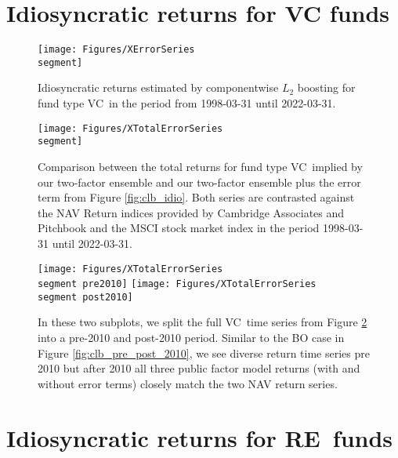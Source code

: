 \clearpage

\appendix

\newcommand{\segment}{BO}

\section{Idiosyncratic returns for VC funds}
\label{sec:vc_errors}


\renewcommand{\segment}{VC}

\begin{figure}[H]
	\centering
	\texttt{[image: Figures/XErrorSeries\\segment]}
	\caption{Idiosyncratic returns estimated by componentwise $L_2$ boosting for fund type \segment \ in the period from 1998-03-31 until 2022-03-31.}
	\label{fig:clb_idio_\segment}
\end{figure}

\begin{figure}[H]
	\centering
	\texttt{[image: Figures/XTotalErrorSeries\\segment]}
	\caption{
		Comparison between the total returns for fund type \segment \ implied by our two-factor ensemble and our two-factor ensemble plus the error term from Figure \ref{fig:clb_idio}.
		Both series are contrasted against the NAV Return indices provided by Cambridge Associates and Pitchbook and the MSCI stock market index in the period 1998-03-31 until 2022-03-31.
	}
	\label{fig:clb_total_\segment}
\end{figure}

\begin{figure}[H]
	\centering
	\texttt{[image: Figures/XTotalErrorSeries\\segment pre2010]}
	\texttt{[image: Figures/XTotalErrorSeries\\segment post2010]}
	\caption{
		In these two subplots, we split the full \segment \ time series from Figure \ref{fig:clb_total_\segment} into a pre-2010 and post-2010 period.
		Similar to the BO case in Figure \ref{fig:clb_pre_post_2010}, we see diverse return time series pre 2010 but after 2010 all three public factor model returns (with and without error terms) closely match the two NAV return series.
	}
	\label{fig:clb_pre_post_2010_\segment}
\end{figure}


\renewcommand{\segment}{RE}

\section{Idiosyncratic returns for \segment \ funds}
\label{sec:errors_\segment}

